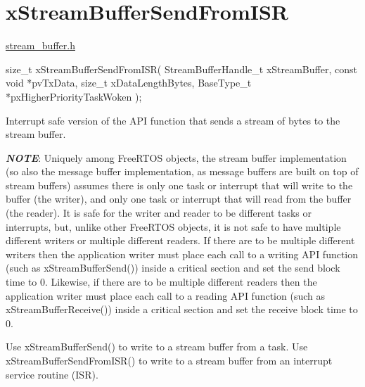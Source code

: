 \hypertarget{group__x_stream_buffer_send_from_i_s_r}{}\section{x\+Stream\+Buffer\+Send\+From\+I\+SR}
\label{group__x_stream_buffer_send_from_i_s_r}
\mbox{\hyperlink{stream__buffer_8h_source}{stream\+\_\+buffer.\+h}}


\begin{DoxyPre}
size\_t xStreamBufferSendFromISR( StreamBufferHandle\_t xStreamBuffer,
                                 const void *pvTxData,
                                 size\_t xDataLengthBytes,
                                 BaseType\_t *pxHigherPriorityTaskWoken );
\end{DoxyPre}


Interrupt safe version of the A\+PI function that sends a stream of bytes to the stream buffer.

{\itshape {\bfseries{N\+O\+TE}}}\+: Uniquely among Free\+R\+T\+OS objects, the stream buffer implementation (so also the message buffer implementation, as message buffers are built on top of stream buffers) assumes there is only one task or interrupt that will write to the buffer (the writer), and only one task or interrupt that will read from the buffer (the reader). It is safe for the writer and reader to be different tasks or interrupts, but, unlike other Free\+R\+T\+OS objects, it is not safe to have multiple different writers or multiple different readers. If there are to be multiple different writers then the application writer must place each call to a writing A\+PI function (such as x\+Stream\+Buffer\+Send()) inside a critical section and set the send block time to 0. Likewise, if there are to be multiple different readers then the application writer must place each call to a reading A\+PI function (such as x\+Stream\+Buffer\+Receive()) inside a critical section and set the receive block time to 0.

Use x\+Stream\+Buffer\+Send() to write to a stream buffer from a task. Use x\+Stream\+Buffer\+Send\+From\+I\+S\+R() to write to a stream buffer from an interrupt service routine (I\+SR).


